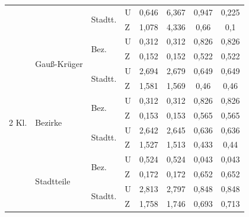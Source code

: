 \documentclass{Vorlage}
\begin{document}
\begin{table}[h]
\begin{tabular}{llll|cc|cc}
                        &                               & \multirow{2}{*}{Stadtt.} & U & 0,646       & 6,367       &   0,947           &   0,225  \\
                        &                               &                          & Z & 1,078        & 4,336       &   0,66           &                0,1 \\ \hline
\multirow{12}{*}{2 Kl.}  & \multirow{4}{*}{Gauß-Krüger} & \multirow{2}{*}{Bez.}   & U & 0,312      & 0,312      &     0,826           &  0,826
 \\
                        &                               &                          & Z & 0,152      & 0,152      &   0,522           &  0,522     \\ \cline{3-8} 
                        &                               & \multirow{2}{*}{Stadtt.} & U & 2,694       & 2,679     &   0,649          &  0,649   \\
                        &                               &                          & Z & 1,581       & 1,569      &  0,46            &   0,46   \\ \cline{2-8} 
                        & \multirow{4}{*}{Bezirke}      & \multirow{2}{*}{Bez.}    & U & 0,312       & 0,312      &  0,826            &   0,826    \\
                        &                               &                          & Z & 0,153       & 0,153      &  0,565            &  0,565    \\ \cline{3-8} 
                        &                               & \multirow{2}{*}{Stadtt.} & U & 2,642       & 2,645      &  0,636           &   0,636    \\
                        &                               &                          & Z & 1,527       & 1,513    &  0,433            &    0,44   
\\ \cline{2-8} 
                        & \multirow{4}{*}{Stadtteile}   & \multirow{2}{*}{Bez.}    & U & 0,524       & 0,524      &   0,043          &    0,043 \\
                        &                               &                          & Z & 0,172       & 0,172      &     0,652        &     0,652 \\ \cline{3-8} 
                        &                               & \multirow{2}{*}{Stadtt.} & U & 2,813        &  2,797      &  0,848     &  0,848 \\
                        &                               &                          & Z & 1,758        & 1,746     &    0,693     &     0,713
                         \\ \hline \hline
\end{tabular}
\end{table}
\end{document}
